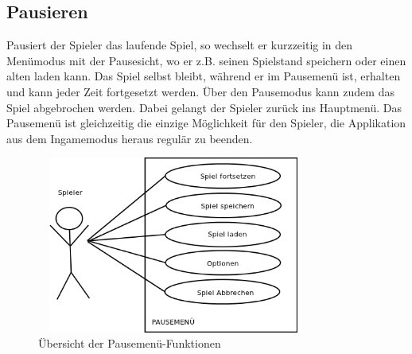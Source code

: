 \subsection{Pausieren}
Pausiert der \gls{Spieler} das laufende Spiel, so wechselt er kurzzeitig in den Menümodus mit
der Pausesicht, wo er z.B. seinen Spielstand speichern oder einen alten laden kann. Das Spiel 
selbst bleibt, während er im Pausemenü ist, erhalten und kann jeder Zeit fortgesetzt werden. 
Über den Pausemodus kann zudem das Spiel abgebrochen werden. Dabei gelangt der \gls{Spieler} 
zurück ins Hauptmenü. Das Pausemenü ist gleichzeitig die einzige
Möglichkeit für den Spieler, die Applikation aus dem Ingamemodus heraus regulär zu beenden.
\begin{figure}[h]
	\begin{center} 
		\includegraphics[width=90mm, height=58mm]
                  {kapitel/funktionen/Pausemenue.png}
	\end{center}
	\caption{Übersicht der Pausemenü-Funktionen}
	\label{fig:pausemenue_funktionen}
\end{figure}

\newpage

